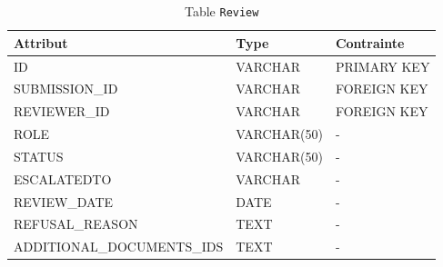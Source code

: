 \begin{table}[h!]
\centering
\begin{tabular}{|l|l|l|}
\hline
\textbf{Attribut} & \textbf{Type} & \textbf{Contrainte} \\
\hline
ID & VARCHAR & PRIMARY KEY \\
SUBMISSION\_ID & VARCHAR & FOREIGN KEY \\
REVIEWER\_ID & VARCHAR & FOREIGN KEY \\
ROLE & VARCHAR(50) & - \\
STATUS & VARCHAR(50) & - \\
ESCALATEDTO & VARCHAR & - \\
REVIEW\_DATE & DATE & - \\
REFUSAL\_REASON & TEXT & - \\
ADDITIONAL\_DOCUMENTS\_IDS & TEXT & - \\
\hline
\end{tabular}
\caption{Table \texttt{Review}}
\end{table}

